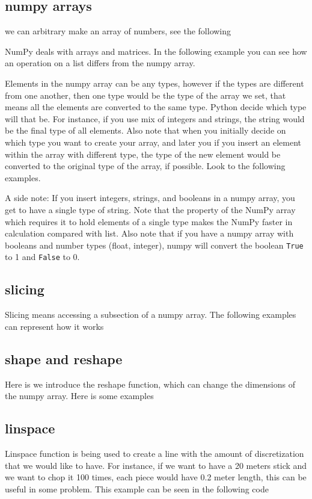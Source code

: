 \documentclass[10pt,a4paper]{article}
\begin{document}
\subsection{numpy arrays}
we can arbitrary make an array of numbers, see the following

\label{subsec:numpy_arrays}
NumPy deals with arrays and matrices. In the following example you can see how an operation on a list differs from the numpy array.

Elements in the numpy array can be any types, however if the types are different from one another, then one type would be the type of the array we set, that means all the elements are converted to the same type. Python  decide which type will that be. For instance, if you use mix of integers and strings, the string would be the final type of all elements. Also note that when you initially decide on which type you want to create your array, and later you if you insert  an element within the array with different type, the type of the new element would be converted to the  original type of the array, if possible. Look to the following examples.

A side note: If you insert integers, strings, and booleans in a numpy array, you get to have a single type of string.
Note that the property of the NumPy array which requires it to hold elements of a single type makes the NumPy faster in calculation compared with list. Also note that if you have a numpy array with booleans and number types (float, integer), numpy will convert the boolean \texttt{True} to 1 and \texttt{False} to 0.
\subsection{slicing}
Slicing means accessing a subsection of a numpy array.
The following examples can represent how it works



\subsection{shape and reshape}
Here is we introduce the reshape function, which can change the dimensions of the numpy array. Here is some examples



\subsection{linspace}
Linspace function is being used to create a line with the amount of discretization that we would like to have. For instance, if we want to have a 20 meters stick and we want to chop it 100 times, each piece would have 0.2 meter length, this can be useful in some problem. This example can be seen in the following code

\end{document}
